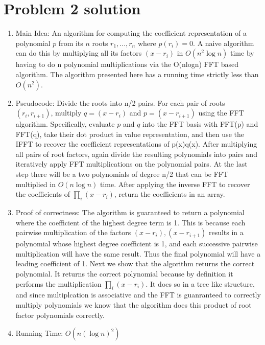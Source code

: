 \documentclass[11pt]{article}
\begin{document}
\section*{Problem 2 solution}
\begin{enumerate}
\item Main Idea: An algorithm for computing the coefficient representation of a polynomial $p$ from its $n$ roots $r_1,..., r_n$ where $p(r_i) = 0$. A naive algorithm can do this by multiplying all its factors $(x-r_i)$ in $O(n^2 \log n)$ time by having to do n polynomial multiplications via the O(nlogn) FFT based algorithm. The algorithm presented here has a running time strictly less than $O(n^2)$.
\item Pseudocode: Divide the roots into n/2 pairs. For each pair of roots $(r_i,r_{i+1})$, multiply $q = (x-r_i)$ and $p = (x-r_{i+1})$ using the FFT algorithm. Specifically, evaluate $p$ and $q$ into the FFT basis with FFT(p) and FFT(q), take their dot product in value representation, and then use the IFFT to recover the coefficient representations of p(x)q(x). After multiplying all pairs of root factors, again divide the resulting polynomials into pairs and iteratively apply FFT multiplications on the polynomial pairs. At the last step there will be a two polynomials of degree n/2 that can be FFT multiplied in $O(n\log n)$ time. After applying the inverse FFT to recover the coefficients of $\prod\limits_{i} (x-r_i)$, return the coefficients in an array.
\item Proof of correctness: The algorithm is guaranteed to return a polynomial where the coefficient of the highest degree term is 1. This is because each pairwise multiplication of the factors $(x-r_i),(x-r_{i+1})$ results in a polynomial whose highest degree coefficient is 1, and each successive pairwise multiplication will have the same result. Thus the final polynomial will have a leading coefficient of 1. Next we show that the algorithm returns the correct polynomial. It returns the correct polynomial because by definition it performs the multiplication $\prod\limits_{i} (x-r_i)$. It does so in a tree like structure, and since multiplcation is associative and the FFT is guanranteed to correctly multiply polynomials we know that the algorithm does this product of root factor polynomials correctly.
\item Running Time: $O(n(\log n)^2)$

\end{enumerate}
\end{document}
